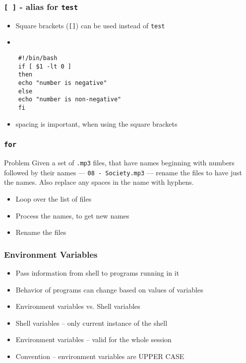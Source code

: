 \documentclass[12pt,compress]{beamer}
\begin{document}
\begin{frame}[fragile]
  \frametitle{\texttt{[ ]} - alias for \texttt{test}}
  \begin{itemize}
  \item Square brackets (\texttt{[]}) can be used instead of
    \texttt{test}
  \item 
  \end{itemize}
  \begin{lstlisting}
    #!/bin/bash
    if [ $1 -lt 0 ]
    then
    echo "number is negative"
    else
    echo "number is non-negative"
    fi
  \end{lstlisting} %
  \begin{itemize}
  \item \alert{spacing is important, when using the square brackets}
  \end{itemize}
\end{frame}

\begin{frame}[fragile]
  \frametitle{\texttt{for}}
  \begin{block}{Problem}
    Given a set of \texttt{.mp3} files, that have names beginning with
    numbers followed by their names --- \texttt{08 - Society.mp3} ---
    rename the files to have just the names. Also replace any spaces
    in the name with hyphens. 
  \end{block}
  \begin{itemize}
  \item Loop over the list of files
  \item Process the names, to get new names
  \item Rename the files
  \end{itemize}
\end{frame}

\begin{frame}[fragile]
  \frametitle{Environment Variables}
  \begin{itemize}
  \item Pass information from shell to programs running in it
  \item Behavior of programs can change based on values of variables
  \item Environment variables vs. Shell variables
  \item Shell variables -- only current instance of the shell
  \item Environment variables -- valid for the whole session
  \item Convention -- environment variables are UPPER CASE
  \end{itemize}
\end{frame}
\end{document}
